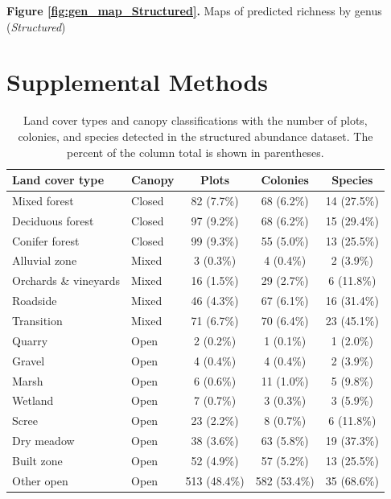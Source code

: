 \documentclass[preprint,final,times,12pt,3p]{elsarticle}
\begin{document}
\textbf{Figure \ref{fig:gen_map_Structured}.} Maps of predicted richness by genus (\emph{Structured})



\newpage
\appendix

\section{Supplemental Methods}

\begin{table}[ht]
	\centering
	\begin{tabular}{ l l c c c}
		\hline
		\textbf{Land cover type} & \textbf{Canopy} & \textbf{Plots} & \textbf{Colonies} & \textbf{Species} \\
		\hline
		Mixed forest & Closed & 82 (7.7\%) & 68 (6.2\%) & 14 (27.5\%) \\
		Deciduous forest & Closed & 97 (9.2\%) & 68 (6.2\%) & 15 (29.4\%) \\
		Conifer forest & Closed & 99 (9.3\%) & 55 (5.0\%) & 13 (25.5\%) \\
		Alluvial zone & Mixed & 3 (0.3\%) & 4 (0.4\%) & 2 (3.9\%) \\
		Orchards \& vineyards & Mixed & 16 (1.5\%) & 29 (2.7\%) & 6 (11.8\%) \\
		Roadside & Mixed & 46 (4.3\%) & 67 (6.1\%) & 16 (31.4\%) \\
		Transition & Mixed & 71 (6.7\%) & 70 (6.4\%) & 23 (45.1\%) \\
		Quarry & Open & 2 (0.2\%) & 1 (0.1\%) & 1 (2.0\%) \\
		Gravel & Open & 4 (0.4\%) & 4 (0.4\%) & 2 (3.9\%) \\
		Marsh & Open & 6 (0.6\%) & 11 (1.0\%) & 5 (9.8\%) \\
		Wetland & Open & 7 (0.7\%) & 3 (0.3\%) & 3 (5.9\%) \\
		Scree & Open & 23 (2.2\%) & 8 (0.7\%) & 6 (11.8\%) \\
		Dry meadow & Open & 38 (3.6\%) & 63 (5.8\%) & 19 (37.3\%) \\
		Built zone & Open & 52 (4.9\%) & 57 (5.2\%) & 13 (25.5\%) \\
		Other open & Open & 513 (48.4\%) & 582 (53.4\%) & 35 (68.6\%) \\
	\end{tabular}
	\caption{\label{table:landcover} Land cover types and canopy classifications with the number of plots, colonies, and species detected in the structured abundance dataset. The percent of the column total is shown in parentheses. }
\end{table}
\end{document}
